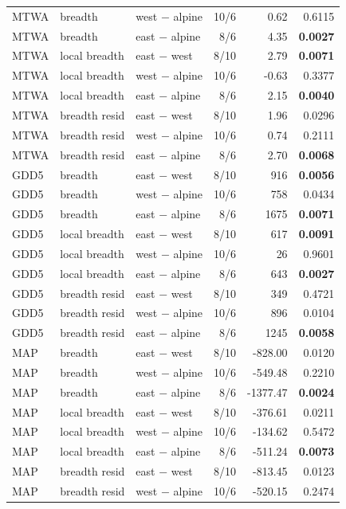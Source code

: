 {\begin{longtable}{lllrrr}
MTWA & breadth & west $-$ alpine & 10/6 & 0.62 & 0.6115 \\
MTWA & breadth & east $-$ alpine & 8/6 & 4.35 & \textbf{0.0027} \\
MTWA & local breadth & east $-$ west & 8/10 & 2.79 & \textbf{0.0071} \\
MTWA & local breadth & west $-$ alpine & 10/6 & -0.63 & 0.3377 \\
MTWA & local breadth & east $-$ alpine & 8/6 & 2.15 & \textbf{0.0040} \\
MTWA & breadth resid & east $-$ west & 8/10 & 1.96 & 0.0296 \\
MTWA & breadth resid & west $-$ alpine & 10/6 & 0.74 & 0.2111 \\
MTWA & breadth resid & east $-$ alpine & 8/6 & 2.70 & \textbf{0.0068} \\
GDD5 & breadth & east $-$ west & 8/10 & 916 & \textbf{0.0056} \\
GDD5 & breadth & west $-$ alpine & 10/6 & 758 & 0.0434 \\
GDD5 & breadth & east $-$ alpine & 8/6 & 1675 & \textbf{0.0071} \\
GDD5 & local breadth & east $-$ west & 8/10 & 617 & \textbf{0.0091} \\
GDD5 & local breadth & west $-$ alpine & 10/6 & 26 & 0.9601 \\
GDD5 & local breadth & east $-$ alpine & 8/6 & 643 & \textbf{0.0027} \\
GDD5 & breadth resid & east $-$ west & 8/10 & 349 & 0.4721 \\
GDD5 & breadth resid & west $-$ alpine & 10/6 & 896 & 0.0104 \\
GDD5 & breadth resid & east $-$ alpine & 8/6 & 1245 & \textbf{0.0058} \\
MAP & breadth & east $-$ west & 8/10 & -828.00 & 0.0120 \\
MAP & breadth & west $-$ alpine & 10/6 & -549.48 & 0.2210 \\
MAP & breadth & east $-$ alpine & 8/6 & -1377.47 & \textbf{0.0024} \\
MAP & local breadth & east $-$ west & 8/10 & -376.61 & 0.0211 \\
MAP & local breadth & west $-$ alpine & 10/6 & -134.62 & 0.5472 \\
MAP & local breadth & east $-$ alpine & 8/6 & -511.24 & \textbf{0.0073} \\
MAP & breadth resid & east $-$ west & 8/10 & -813.45 & 0.0123 \\
MAP & breadth resid & west $-$ alpine & 10/6 & -520.15 & 0.2474 \\

\end{longtable}}
